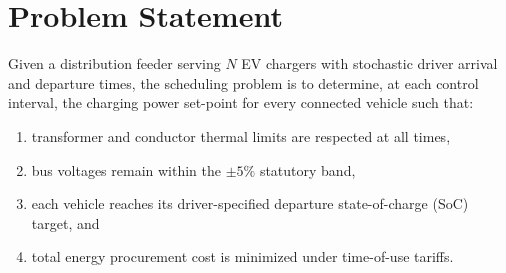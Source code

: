 \section{Problem Statement}
Given a distribution feeder serving $N$ EV chargers with stochastic driver arrival and
departure times, the scheduling problem is to determine, at each control interval, the charging
power set-point for every connected vehicle such that:
\begin{enumerate}[leftmargin=1.4cm]
  \item transformer and conductor thermal limits are respected at all times,
  \item bus voltages remain within the $\pm 5\%$ statutory band,
  \item each vehicle reaches its driver-specified departure state-of-charge (SoC) target, and
  \item total energy procurement cost is minimized under time-of-use tariffs.
\end{enumerate}
